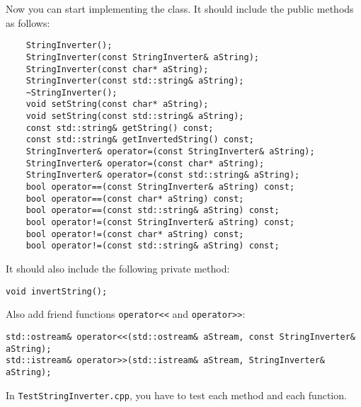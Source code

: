 Now you can start implementing the class. It should include the public methods as follows:
\begin{lstlisting}
    StringInverter();
    StringInverter(const StringInverter& aString);
    StringInverter(const char* aString);
    StringInverter(const std::string& aString);
    ~StringInverter();
    void setString(const char* aString);
    void setString(const std::string& aString);
    const std::string& getString() const;
    const std::string& getInvertedString() const;
    StringInverter& operator=(const StringInverter& aString);
    StringInverter& operator=(const char* aString);
    StringInverter& operator=(const std::string& aString);
    bool operator==(const StringInverter& aString) const;
    bool operator==(const char* aString) const;
    bool operator==(const std::string& aString) const;
    bool operator!=(const StringInverter& aString) const;
    bool operator!=(const char* aString) const;
    bool operator!=(const std::string& aString) const;
\end{lstlisting}

It should also include the following private method:
\begin{lstlisting}
void invertString();
\end{lstlisting}


Also add friend functions \verb+operator<<+ and \verb+operator>>+:
\begin{lstlisting}
std::ostream& operator<<(std::ostream& aStream, const StringInverter& aString);
std::istream& operator>>(std::istream& aStream, StringInverter& aString);
\end{lstlisting}

In \verb+TestStringInverter.cpp+, you have to test each method and each function. 
